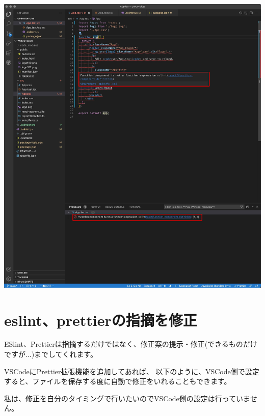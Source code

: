 \begin{reviewimage}[H]%
\includegraphics[width=1.0\maxwidth]{./images/02-create-react-app/032_app_tsx_error.png}%
\label{image:02-create-react-app:032_app_tsx_error}
\end{reviewimage}

\section{eslint、prettierの指摘を修正}
\keeplastskip{
  \label{sec:2-4}
  \label{sec-04fix}
  \par\nobreak
}

ESlint、Prettierは指摘するだけではなく、修正案の提示・修正(できるものだけですが...)までしてくれます。

\vspace*{\baselineskip}

VSCodeにPrettier拡張機能を追加してあれば、
以下のように、VSCode側で設定すると、ファイルを保存する度に自動で修正をいれることもできます。

\vspace*{\baselineskip}

私は、修正を自分のタイミングで行いたいのでVSCode側の設定は行っていません。

